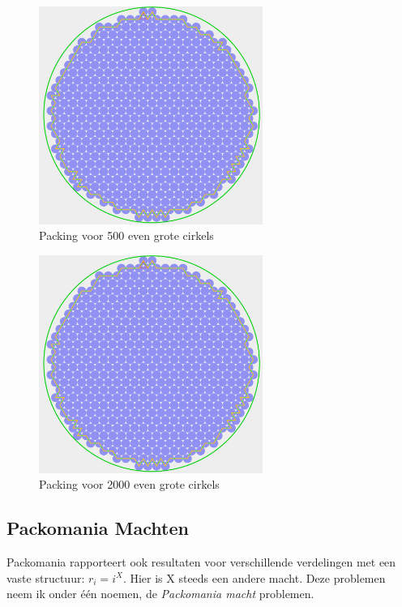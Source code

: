 \documentclass[12pt,a4paper,oneside]{book}
\begin{document}
\begin{figure}
  \centering
  \includegraphics[width=0.65\textwidth]{packing-even-groot-500.png}
  \caption{Packing voor 500 even grote cirkels} \label{fig:packing-even-groot-500} 
\end{figure}

\begin{figure}
  \centering
  \includegraphics[width=0.65\textwidth]{packing-even-groot-2000.png}
  \caption{Packing voor 2000 even grote cirkels} \label{fig:packing-even-groot-2000} 
\end{figure}

\subsection{Packomania Machten}

Packomania rapporteert ook resultaten voor verschillende verdelingen met een vaste structuur: $r_i=i^X$.
Hier is X steeds een andere macht.
Deze problemen neem ik onder één noemen, de \textit{Packomania macht} problemen.
\end{document}
